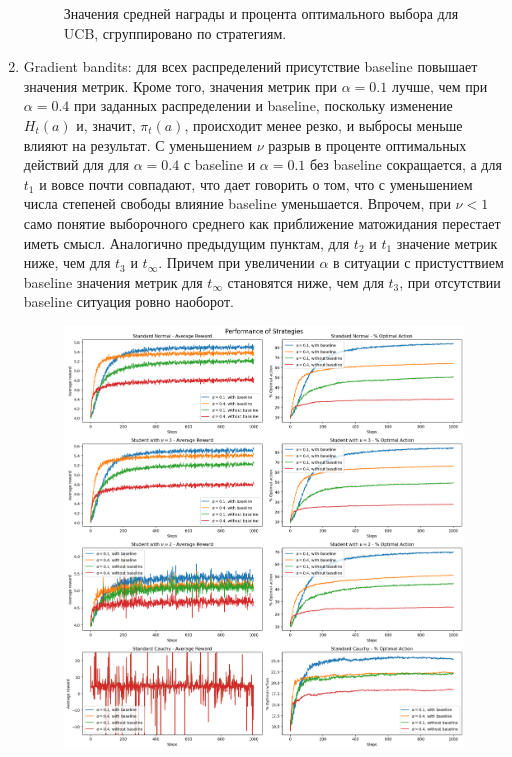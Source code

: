 \documentclass{article}
\begin{document}
\begin{enumerate}
\begin{figure}[t]
        \caption{\label{fig:ucb_2}Значения средней награды и процента оптимального выбора для UCB, сгруппировано по стратегиям.}
    \end{figure}
    \item Gradient bandits: для всех распределений присутствие baseline повышает значения метрик. Кроме того, значения метрик при $\alpha=0.1$ лучше, чем при $\alpha=0.4$ при заданных распределении и baseline, поскольку изменение $H_t(a)$ и, значит, $\pi_t(a)$, происходит менее резко, и выбросы меньше влияют на результат. С уменьшением $\nu$ разрыв в проценте оптимальных действий для для $\alpha=0.4$ с baseline и $\alpha=0.1$ без baseline сокращается, а для $t_1$ и вовсе почти совпадают, что дает говорить о том, что с уменьшением числа степеней свободы влияние baseline уменьшается. Впрочем, при $\nu < 1$ само понятие выборочного среднего как приближение матожидания перестает иметь смысл. Аналогично предыдущим пунктам, для $t_2$ и $t_1$ значение метрик ниже, чем для $t_3$ и $t_{\infty}$. Причем при увеличении $\alpha$ в ситуации с пристусттвием baseline значения метрик для $t_{\infty}$ становятся ниже, чем для $t_3$, при отсутствии baseline ситуация ровно наоборот.
    \begin{figure}
        \centering
        \includegraphics[width=1.1\linewidth]{gradient_1.png}

\end{figure}
\end{enumerate}
\end{document}
